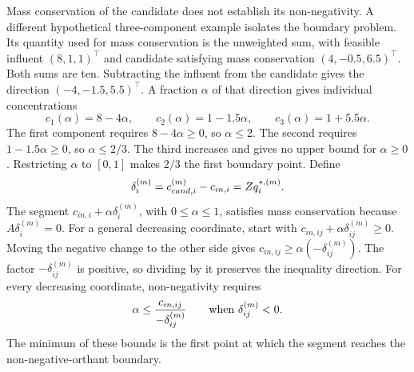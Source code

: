 Mass conservation of the candidate does not establish its non-negativity. A different hypothetical three-component example isolates the boundary problem. Its quantity used for mass conservation is the unweighted sum, with feasible influent $(8,1,1)^\top$ and candidate satisfying mass conservation $(4,-0.5,6.5)^\top$. Both sums are ten. Subtracting the influent from the candidate gives the direction $(-4,-1.5,5.5)^\top$. A fraction $\alpha$ of that direction gives individual concentrations
\[
c_1(\alpha)=8-4\alpha,\qquad
c_2(\alpha)=1-1.5\alpha,\qquad
c_3(\alpha)=1+5.5\alpha.
\]
The first component requires $8-4\alpha\geq0$, so $\alpha\leq2$. The second requires $1-1.5\alpha\geq0$, so $\alpha\leq2/3$. The third increases and gives no upper bound for $\alpha\geq0$. Restricting $\alpha$ to $[0,1]$ makes $2/3$ the first boundary point. Define
\begin{equation}
\equationname{Candidate direction from the feasible influent anchor}
\delta_i^{(m)}=c_{cand,i}^{(m)}-c_{in,i}=Zq_i^{*,(m)}.
\label{eq:projection_candidate_direction}
\end{equation}
The segment $c_{in,i}+\alpha\delta_i^{(m)}$, with $0\leq\alpha\leq1$, satisfies mass conservation because $A\delta_i^{(m)}=0$. For a general decreasing coordinate, start with $c_{in,ij}+\alpha\delta_{ij}^{(m)}\geq0$. Moving the negative change to the other side gives $c_{in,ij}\geq\alpha(-\delta_{ij}^{(m)})$. The factor $-\delta_{ij}^{(m)}$ is positive, so dividing by it preserves the inequality direction. For every decreasing coordinate, non-negativity requires
\begin{equation}
\equationname{Interpolation bound for a decreasing concentration}
\alpha\leq\frac{c_{in,ij}}{-\delta_{ij}^{(m)}}
\qquad\text{when }\delta_{ij}^{(m)}<0.
\label{eq:projection_coordinate_bound}
\end{equation}
The minimum of these bounds is the first point at which the segment reaches the non-negative-orthant boundary.

